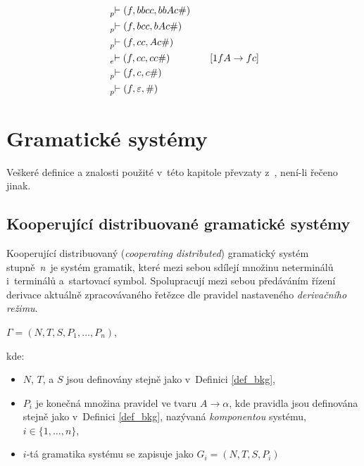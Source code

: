 \begin{example}
\begin{alignat*}{2}
                             &\prescript{}{p}{\vdash}\; (f, bbcc, bbAc\#) \quad && \\
                             &\prescript{}{p}{\vdash}\; (f, bcc, bAc\#) \quad && \\
                             &\prescript{}{p}{\vdash}\; (f, cc, Ac\#) \quad && \\
                             &\prescript{}{e}{\vdash}\; (f, cc, cc\#) \quad && [1fA \rightarrow fc] \\ 
                             &\prescript{}{p}{\vdash}\; (f, c, c\#) \quad && \\
                             &\prescript{}{p}{\vdash}\; (f, \varepsilon, \#) \quad &&
    \end{alignat*}
\end{example}

\chapter{Gramatické systémy}\label{kap_GS}
Veškeré definice a znalosti použité v~této kapitole převzaty z~\cite{CDGS, PCGS, Handbook-Of-Formal-Languages-2}, není-li řečeno jinak.

\section{Kooperující distribuované gramatické systémy}\label{kap_CDGS}

Kooperující distribuovaný (\emph{cooperating distributed}) gramatický systém stupně~\emph{n}~je systém gramatik, které mezi sebou sdílejí množinu neterminálů i~terminálů a~startovací symbol.
Spolupracují mezi sebou předáváním řízení derivace aktuálně zpracovávaného řetězce dle pravidel nastaveného \emph{derivačního režimu}.

\begin{definition}\label{def_cdgs}
\begin{center}
    $\Gamma = (N, T, S, P_1, \ldots ,P_n)$,
\end{center}
kde:
\begin{itemize}
    \item $N$, $T$, a $S$ jsou definovány stejně jako v~Definici \ref{def_bkg},
    \item $P_i$ je konečná množina pravidel ve tvaru $A\rightarrow \alpha$, kde pravidla jsou definována stejně jako v~Definici \ref{def_bkg}, nazývaná \emph{komponentou} systému, $i \in \{1, \ldots, n\}$,
    \item $i$-tá gramatika systému se zapisuje jako $G_i = (N,T,S,P_i)$
\end{itemize}   
\end{definition}

